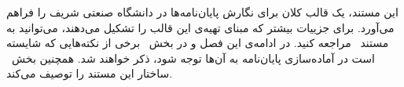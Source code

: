 
این مستند، یک قالب کلان برای نگارش پایان‌نامه‌ها در دانشگاه صنعتی شریف را فراهم می‌آورد. برای جزییات بیشتر که مبنای تهیه‌ی این قالب را تشکیل می‌دهند، می‌توانید به مستند~ مراجعه کنید. در ادامه‌ی این فصل و در بخش~ برخی از نکته‌هایی که شایسته است در آماده‌سازی پایان‌نامه به آن‌ها توجه شود، ذکر خواهند شد. همچنین بخش~ ساختار این مستند را توصیف می‌کند.





